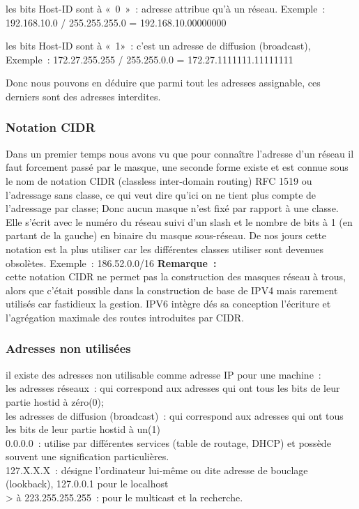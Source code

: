      les bits Host-ID sont à « 0 » : adresse attribue qu’à un réseau.
Exemple : 192.168.10.0 / 255.255.255.0  =   192.168.10.00000000

    les bits Host-ID sont à « 1» : c’est un adresse de  diffusion (broadcast),
Exemple : 172.27.255.255 / 255.255.0.0  =   172.27.1111111.11111111

Donc nous pouvons en déduire que parmi tout les adresses assignable, ces
derniers sont des adresses interdites.

\subsubsection{Notation CIDR}
Dans un premier temps nous avons vu que pour connaître l’adresse d’un
réseau il faut forcement passé par le masque, une seconde forme existe et est
connue sous le nom de notation CIDR (classless inter-domain routing) RFC 1519
ou l’adressage sans classe, ce qui veut dire qu’ici on ne tient plus compte de
l’adressage par classe; Donc aucun masque n’est fixé par rapport à une classe.
Elle s’écrit avec le numéro du réseau suivi d’un slash et le nombre de bits à 1
(en partant de la gauche) en binaire du masque sous-réseau. De nos jours cette
notation est la plus utiliser car les différentes classes utiliser sont
devenues  obsolètes.
\vspace{1cm}
Exemple : 186.52.0.0/16
\vspace{1cm}
\textbf{ Remarque :} \\
cette notation CIDR ne permet pas la construction des masques réseau à trous,
alors que c’était possible dans la construction de base de IPV4 mais rarement
utilisés car fastidieux la gestion.  IPV6 intègre dés sa conception l’écriture
et l’agrégation maximale des routes introduites par CIDR. 


\subsubsection{Adresses non utilisées}
il existe des adresses non utilisable comme adresse IP pour une machine :\\
les adresses réseaux : qui correspond aux adresses qui ont tous les bits de
leur partie hostid à zéro(0);\\
les adresses de diffusion (broadcast) : qui correspond aux adresses qui ont
tous les bits de leur partie hostid à un(1)\\
0.0.0.0 : utilise par différentes services (table de routage, DHCP) et possède
souvent une signification particulières. \\
127.X.X.X : désigne l’ordinateur lui-même ou dite adresse de bouclage
(lookback), 127.0.0.1 pour le localhost\\
> à 223.255.255.255 : pour le multicast et la recherche.\\


